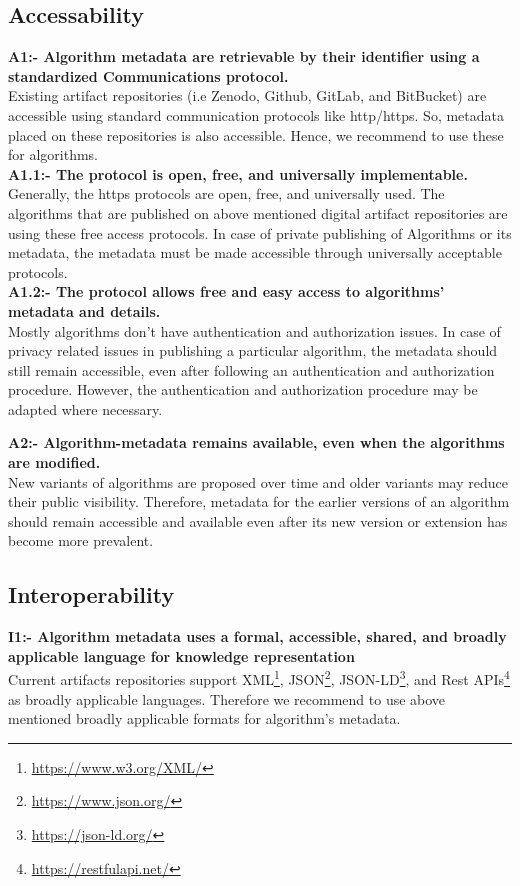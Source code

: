 \documentclass[preprint,12pt]{elsarticle}
\begin{document}
\subsection{Accessability}
\textbf{A1:- Algorithm metadata are retrievable by their identifier using a standardized Communications protocol.}\\
Existing artifact repositories (i.e Zenodo, Github, GitLab, and BitBucket) are accessible using standard communication protocols like http/https. So, metadata placed on these repositories is also accessible. Hence, we recommend to use these for algorithms.  \\

\textbf{A1.1:- The protocol is open, free, and universally implementable.}\\
Generally, the https protocols are open, free, and universally used. The algorithms that are published on above mentioned digital artifact repositories are using these free access protocols. In case of private publishing of Algorithms or its metadata, the metadata must be made accessible through universally acceptable protocols.\\

\textbf{A1.2:- The protocol allows free and easy access to algorithms’ metadata and details.}\\

Mostly algorithms don't have authentication and authorization issues. In case of privacy related issues in publishing a particular algorithm, the metadata should still remain accessible, even after following an authentication and authorization procedure. However, the authentication and authorization procedure may be adapted where necessary.


\textbf{A2:- Algorithm-metadata remains available, even when the algorithms are modified.}\\
New variants of algorithms are proposed over time and older variants may reduce their public visibility. Therefore, metadata for the earlier versions of an algorithm should remain accessible and available even after its new version or extension has become more prevalent.\\

\subsection{Interoperability}
\textbf{I1:- Algorithm metadata uses a formal, accessible, shared, and broadly applicable language for knowledge representation}\\
Current artifacts repositories support XML\footnote{\url{https://www.w3.org/XML/}}, JSON\footnote{\url{https://www.json.org/}}, JSON-LD\footnote{\url{https://json-ld.org/}}, and Rest APIs\footnote{\url{https://restfulapi.net/}} as broadly applicable languages. Therefore we recommend to use above mentioned broadly applicable formats for algorithm's metadata. 
\end{document}
